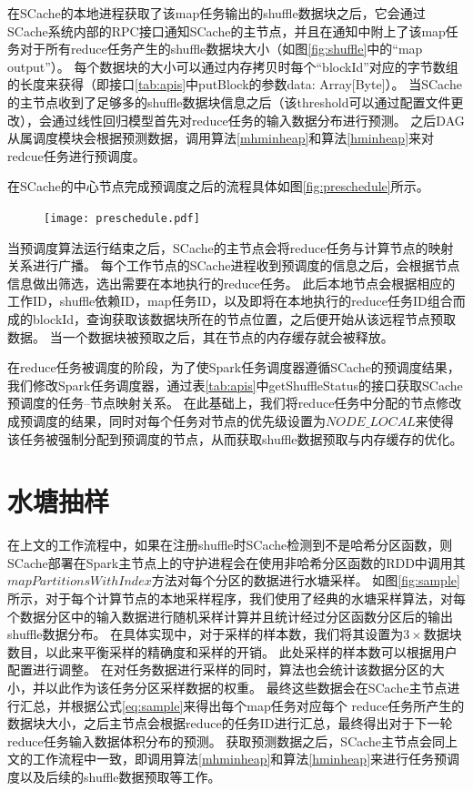 在SCache的本地进程获取了该map任务输出的shuffle数据块之后，它会通过SCache系统内部的RPC接口通知SCache的主节点，并且在通知中附上了该map任务对于所有reduce任务产生的shuffle数据块大小（如图\ref{fig:shuffle}中的“map output”）。
每个数据块的大小可以通过内存拷贝时每个“blockId”对应的字节数组的长度来获得（即接口\ref{tab:apis}中putBlock的参数data: Array[Byte]）。
当SCache的主节点收到了足够多的shuffle数据块信息之后（该threshold可以通过配置文件更改），会通过线性回归模型首先对reduce任务的输入数据分布进行预测。
之后DAG从属调度模块会根据预测数据，调用算法\ref{mhminheap}和算法\ref{hminheap}来对redcue任务进行预调度。

在SCache的中心节点完成预调度之后的流程具体如图\ref{fig:preschedule}所示。

\begin{figure}[!htp]
	\centering
	\texttt{[image: preschedule.pdf]}
\end{figure}

当预调度算法运行结束之后，SCache的主节点会将reduce任务与计算节点的映射关系进行广播。
每个工作节点的SCache进程收到预调度的信息之后，会根据节点信息做出筛选，选出需要在本地执行的reduce任务。
此后本地节点会根据相应的工作ID，shuffle依赖ID，map任务ID，以及即将在本地执行的reduce任务ID组合而成的blockId，查询获取该数据块所在的节点位置，之后便开始从该远程节点预取数据。
当一个数据块被预取之后，其在节点的内存缓存就会被释放。

在reduce任务被调度的阶段，为了使Spark任务调度器遵循SCache的预调度结果，我们修改Spark任务调度器，通过表\ref{tab:apis}中getShuffleStatus的接口获取SCache预调度的任务--节点映射关系。
在此基础上，我们将reduce任务中分配的节点修改成预调度的结果，同时对每个任务对节点的优先级设置为$NODE\_LOCAL$\cite{sparksource}来使得该任务被强制分配到预调度的节点，从而获取shuffle数据预取与内存缓存的优化。

\section{水塘抽样}
\label{sec:sampling}

在上文的工作流程中，如果在注册shuffle时SCache检测到不是哈希分区函数，则SCache部署在Spark主节点上的守护进程会在使用非哈希分区函数的RDD中调用其$mapPartitionsWithIndex$\cite{sparksource}方法对每个分区的数据进行水塘采样。
如图\ref{fig:sample}所示，对于每个计算节点的本地采样程序，我们使用了经典的水塘采样算法\cite{reservoir}，对每个数据分区中的输入数据进行随机采样计算并且统计经过分区函数分区后的输出shuffle数据分布。
在具体实现中，对于采样的样本数，我们将其设置为$3 \times $数据块数目，以此来平衡采样的精确度和采样的开销。
此处采样的样本数可以根据用户配置进行调整。
在对任务数据进行采样的同时，算法也会统计该数据分区的大小，并以此作为该任务分区采样数据的权重。
最终这些数据会在SCache主节点进行汇总，并根据公式\ref{eq:sample}来得出每个map任务对应每个
reduce任务所产生的数据块大小，之后主节点会根据reduce的任务ID进行汇总，最终得出对于下一轮reduce任务输入数据体积分布的预测。
获取预测数据之后，SCache主节点会同上文的工作流程中一致，即调用算法\ref{mhminheap}和算法\ref{hminheap}来进行任务预调度以及后续的shuffle数据预取等工作。

